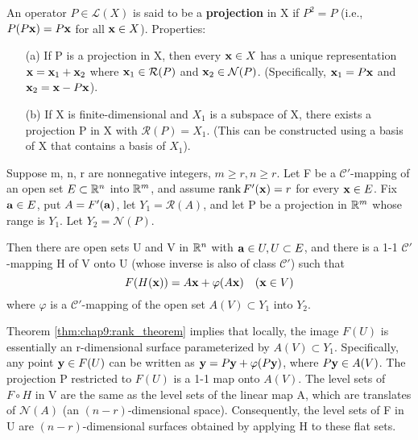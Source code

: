 \begin{definition}[Projection]
  \label{def:chap9:projection}
  An operator $P \in \mathcal{L}(X)$ is said to be a
  \textbf{projection} in X if $P^2 = P$ (i.e., $P(P\mathbf{x}) =
  P\mathbf{x}$ for all $\mathbf{x} \in X$).
  Properties:
  \begin{itemize}
    \item[(a)] If P is a projection in X, then every $\mathbf{x} \in X$
      has a unique representation $\mathbf{x} = \mathbf{x}_1 +
      \mathbf{x}_2$ where $\mathbf{x}_1 \in \mathcal{R}(P)$ and
      $\mathbf{x}_2 \in \mathcal{N}(P)$. (Specifically, $\mathbf{x}_1 =
      P\mathbf{x}$ and $\mathbf{x}_2 = \mathbf{x} - P\mathbf{x}$).
    \item[(b)] If X is finite-dimensional and $X_1$ is a subspace of
      X, there exists a projection P in X with $\mathcal{R}(P) =
      X_1$. (This can be constructed using a basis of X that contains
      a basis of $X_1$).
  \end{itemize}
\end{definition}

\begin{theorem}
  \label{thm:chap9:rank_theorem}
  Suppose m, n, r are nonnegative integers, $m \ge r, n \ge r$. Let F
  be a $\mathcal{C}'$-mapping of an open set $E \subset \mathbb{R}^n$ into
  $\mathbb{R}^m$, and assume $\operatorname{rank} F'(\mathbf{x}) = r$ for every $\mathbf{x} \in E$.
  Fix $\mathbf{a} \in E$, put $A = F'(\mathbf{a})$, let $Y_1 =
  \mathcal{R}(A)$, and let P be a projection in $\mathbb{R}^m$ whose range is
  $Y_1$. Let $Y_2 = \mathcal{N}(P)$.

  Then there are open sets U and V in $\mathbb{R}^n$ with $\mathbf{a} \in U, U
  \subset E$, and there is a 1-1 $\mathcal{C}'$-mapping H of V onto U
  (whose inverse is also of class $\mathcal{C}'$) such that
  \[
    F(H(\mathbf{x})) = A\mathbf{x} + \varphi(A\mathbf{x}) \quad (\mathbf{x} \in V)
  \]
  where $\varphi$ is a $\mathcal{C}'$-mapping of the open set $A(V)
  \subset Y_1$ into $Y_2$.
\end{theorem}

\begin{remark}
  \label{rem:chap9:rank_thm_geometry}
  Theorem \ref{thm:chap9:rank_theorem} implies that locally, the
  image $F(U)$ is essentially an r-dimensional surface parameterized
  by $A(V) \subset Y_1$. Specifically, any point $\mathbf{y} \in F(U)$
  can be written as $\mathbf{y} = P\mathbf{y} + \varphi(P\mathbf{y})$,
  where $P\mathbf{y} \in A(V)$. The projection P restricted to $F(U)$
  is a 1-1 map onto $A(V)$.
  The level sets of $F \circ H$ in V are the same as the level sets
  of the linear map A, which are translates of $\mathcal{N}(A)$ (an
  $(n-r)$-dimensional space). Consequently, the level sets of F in U
  are $(n-r)$-dimensional surfaces obtained by applying H to these flat sets.
\end{remark}

